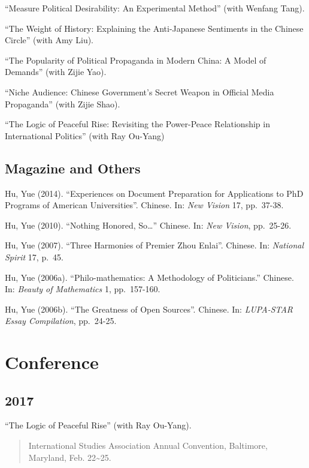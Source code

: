 \documentclass[10.5pt,]{article}
\begin{document}
``Measure Political Desirability: An Experimental Method'' (with Wenfang
Tang).

``The Weight of History: Explaining the Anti-Japanese Sentiments in the
Chinese Circle'' (with Amy Liu).

``The Popularity of Political Propaganda in Modern China: A Model of
Demands'' (with Zijie Yao).

``Niche Audience: Chinese Government's Secret Weapon in Official Media
Propaganda'' (with Zijie Shao).

``The Logic of Peaceful Rise: Revisiting the Power-Peace Relationship in
International Politics'' (with Ray Ou-Yang)

\subsection{Magazine and Others}\label{magazine-and-others}

Hu, Yue (2014). ``Experiences on Document Preparation for Applications
to PhD Programs of American Universities''. Chinese. In: \emph{New
Vision} 17, pp.~37-38.

Hu, Yue (2010). ``Nothing Honored, So\ldots{}'' Chinese. In: \emph{New
Vision}, pp.~25-26.

Hu, Yue (2007). ``Three Harmonies of Premier Zhou Enlai''. Chinese. In:
\emph{National Spirit} 17, p.~45.

Hu, Yue (2006a). ``Philo-mathematics: A Methodology of Politicians.''
Chinese. In: \emph{Beauty of Mathematics} 1, pp.~157-160.

Hu, Yue (2006b). ``The Greatness of Open Sources''. Chinese. In:
\emph{LUPA-STAR Essay Compilation}, pp.~24-25.

\section{Conference}\label{conference}

\subsection{2017}\label{section}

``The Logic of Peaceful Rise'' (with Ray Ou-Yang).

\begin{quote}
\footnotesize International Studies Association Annual Convention,
Baltimore, Maryland, Feb. 22\textasciitilde{}25.
\end{quote}
\end{document}
